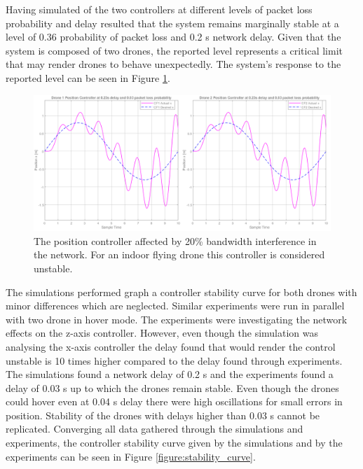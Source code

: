 Having simulated of the two controllers at different levels of packet loss probability and delay resulted that the system remains marginally stable at a level of 0.36 probability of packet loss and 0.2 s network delay. Given that the system is composed of two drones, the reported level represents a critical limit that may render drones to behave unexpectedly. The system's response to the reported level can be seen in Figure \ref{figure:loss03}.


\begin{figure}[H]
\centering
 \includegraphics[scale=0.4]{Figures/2drones_maxprob.png}
 \caption{The position controller affected by 20\% bandwidth interference in the network. For an indoor flying drone this controller is considered unstable. }
 \label{figure:loss03}
\end{figure}

The simulations performed graph a controller stability curve for both drones with minor differences which are neglected. Similar experiments were run in parallel with two drone in hover mode. The experiments were investigating the network effects on the z-axis controller. However, even though the simulation was analysing the x-axis controller the delay found that would render the control unstable is 10 times higher compared to the delay found through experiments. The simulations found a network delay of 0.2 s and the experiments found a delay of 0.03 s up to which the drones remain stable. Even though the drones could hover even at 0.04 s delay there were high oscillations for small errors in position. Stability of the drones with delays higher than 0.03 s cannot be replicated. Converging all data gathered through the simulations and experiments, the controller stability curve given by the simulations and by the experiments can be seen in Figure \ref{figure:stability_curve}.\\

